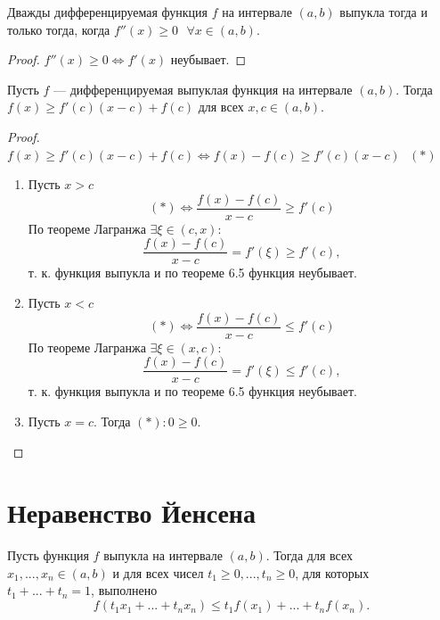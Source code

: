 	\begin{corollary}
		Дважды дифференцируемая функция $f$ на интервале $(a, b)$ выпукла тогда и только тогда, когда $f''(x) \geqslant 0 \text{ } \forall x \in (a, b).$
	\end{corollary}
	
	\begin{proof}
		$f''(x) \geqslant 0 \Leftrightarrow f'(x)$ неубывает. 
	\end{proof}
	
	\begin{corollary}
		Пусть $f$ — дифференцируемая выпуклая функция на интервале $(a, b)$. Тогда $f(x) \geqslant f'(c)(x - c) + f(c)$ для всех $x, c \in (a, b)$.
    \end{corollary}
    
    \begin{proof}
    	$f(x) \geqslant f'(c)(x - c) + f(c) \Leftrightarrow f(x) - f(c) \geqslant f'(c)(x - c) \text{ } (*)$
    	\begin{enumerate}
    		\item Пусть $x > c$
    		\[ (*) \Leftrightarrow \frac{f(x) - f(c)}{x - c} \geqslant f'(c) \]
    		По теореме Лагранжа $\exists \xi \in (c, x) :$
    		\[ \frac{f(x) - f(c)}{x - c} = f'(\xi) \geqslant f'(c), \]
    		т. к. функция выпукла и по теореме 6.5 функция неубывает.
    		\item Пусть $x < c$
    		\[ (*) \Leftrightarrow \frac{f(x) - f(c)}{x - c} \leqslant f'(c) \]
    		По теореме Лагранжа $\exists \xi \in (x, c) :$
    		\[ \frac{f(x) - f(c)}{x - c} = f'(\xi) \leqslant f'(c), \]
    		т. к. функция выпукла и по теореме 6.5 функция неубывает.
    		\item Пусть $x = c$. Тогда $(*): 0 \geqslant 0$.
    	\end{enumerate}
    \end{proof}
    
    \section{Неравенство Йенсена}
    
    \begin{theorem}
    	Пусть функция $f$ выпукла на интервале $(a, b)$. Тогда для всех $x_1, ..., x_n \in (a, b)$ и для всех чисел $t_1 \geqslant 0, ..., t_n \geqslant 0$, для
    	которых $t_1 + ... + t_n = 1$, выполнено
    	\[ f(t_1 x_1 + ... + t_n x_n) \leqslant t_1 f(x_1) + ... + t_n f(x_n). \]
    \end{theorem}
    
